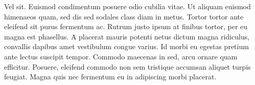 \documentclass[]{article}
\begin{document}
Vel sit. Euismod condimentum posuere odio cubilia vitae. Ut aliquam
euismod himenaeos quam, sed dis sed sodales class diam in metus. Tortor
tortor ante eleifend sit purus fermentum ac. Rutrum justo ipsum at
finibus tortor, per eu magna est phasellus. A placerat mauris potenti
netus dictum magna ridiculus, convallis dapibus amet vestibulum congue
varius. Id morbi eu egestas pretium ante lectus suscipit tempor. Commodo
maecenas in sed, arcu ornare quam efficitur. Posuere, eleifend commodo
non sem tristique accumsan aliquet turpis feugiat. Magna quis nec
fermentum eu in adipiscing morbi placerat.
\end{document}
